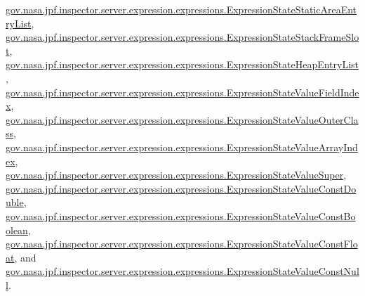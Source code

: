 \hyperlink{classgov_1_1nasa_1_1jpf_1_1inspector_1_1server_1_1expression_1_1expressions_1_1_expression_state_static_area_entry_list_adeb7b6c431edf2a46015e3b9a5e6dce6}{gov.\+nasa.\+jpf.\+inspector.\+server.\+expression.\+expressions.\+Expression\+State\+Static\+Area\+Entry\+List}, \hyperlink{classgov_1_1nasa_1_1jpf_1_1inspector_1_1server_1_1expression_1_1expressions_1_1_expression_state_stack_frame_slot_a4f04945cb68f2ad02d3fe8db36179f1f}{gov.\+nasa.\+jpf.\+inspector.\+server.\+expression.\+expressions.\+Expression\+State\+Stack\+Frame\+Slot}, \hyperlink{classgov_1_1nasa_1_1jpf_1_1inspector_1_1server_1_1expression_1_1expressions_1_1_expression_state_heap_entry_list_a177111768101430f6943fe04956579ca}{gov.\+nasa.\+jpf.\+inspector.\+server.\+expression.\+expressions.\+Expression\+State\+Heap\+Entry\+List}, \hyperlink{classgov_1_1nasa_1_1jpf_1_1inspector_1_1server_1_1expression_1_1expressions_1_1_expression_state_value_field_index_a27a15a9a4ea2cc283d8fe9c00f2a6a6f}{gov.\+nasa.\+jpf.\+inspector.\+server.\+expression.\+expressions.\+Expression\+State\+Value\+Field\+Index}, \hyperlink{classgov_1_1nasa_1_1jpf_1_1inspector_1_1server_1_1expression_1_1expressions_1_1_expression_state_value_outer_class_af25a48b00aad1fa3578e0554d1506c8d}{gov.\+nasa.\+jpf.\+inspector.\+server.\+expression.\+expressions.\+Expression\+State\+Value\+Outer\+Class}, \hyperlink{classgov_1_1nasa_1_1jpf_1_1inspector_1_1server_1_1expression_1_1expressions_1_1_expression_state_value_array_index_ad72611ba9e78fb2d724ad26d437600a9}{gov.\+nasa.\+jpf.\+inspector.\+server.\+expression.\+expressions.\+Expression\+State\+Value\+Array\+Index}, \hyperlink{classgov_1_1nasa_1_1jpf_1_1inspector_1_1server_1_1expression_1_1expressions_1_1_expression_state_value_super_a0e3c6a2aced7b9791f5c0842c734b78d}{gov.\+nasa.\+jpf.\+inspector.\+server.\+expression.\+expressions.\+Expression\+State\+Value\+Super}, \hyperlink{classgov_1_1nasa_1_1jpf_1_1inspector_1_1server_1_1expression_1_1expressions_1_1_expression_state_value_const_double_a42eedfe15044564e744061af712c7848}{gov.\+nasa.\+jpf.\+inspector.\+server.\+expression.\+expressions.\+Expression\+State\+Value\+Const\+Double}, \hyperlink{classgov_1_1nasa_1_1jpf_1_1inspector_1_1server_1_1expression_1_1expressions_1_1_expression_state_value_const_boolean_a1ddaedcf0fb85b579d3764d2154ea945}{gov.\+nasa.\+jpf.\+inspector.\+server.\+expression.\+expressions.\+Expression\+State\+Value\+Const\+Boolean}, \hyperlink{classgov_1_1nasa_1_1jpf_1_1inspector_1_1server_1_1expression_1_1expressions_1_1_expression_state_value_const_float_aedd6f475efc09580ba128165d42760df}{gov.\+nasa.\+jpf.\+inspector.\+server.\+expression.\+expressions.\+Expression\+State\+Value\+Const\+Float}, and \hyperlink{classgov_1_1nasa_1_1jpf_1_1inspector_1_1server_1_1expression_1_1expressions_1_1_expression_state_value_const_null_a6edbf78a9e14eae34d8f7de9d33d0a32}{gov.\+nasa.\+jpf.\+inspector.\+server.\+expression.\+expressions.\+Expression\+State\+Value\+Const\+Null}.

